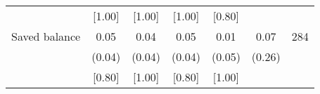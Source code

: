 \begin{table}[ht]
{\begin{threeparttable}
\begin{tabular}{l*{6}{c}}
          &   [1.00]&   [1.00]&   [1.00]&   [0.80]&         &         \\
Saved balance&     0.05&     0.04&     0.05&     0.01&     0.07&      284\\
          &   (0.04)&   (0.04)&   (0.04)&   (0.05)&   (0.26)&         \\
          &   [0.80]&   [1.00]&   [0.80]&   [1.00]&         &         \\
\bottomrule \end{tabular} \begin{tablenotes}[flushleft] \footnotesize \item  \end{tablenotes} \end{threeparttable} } \end{table}
